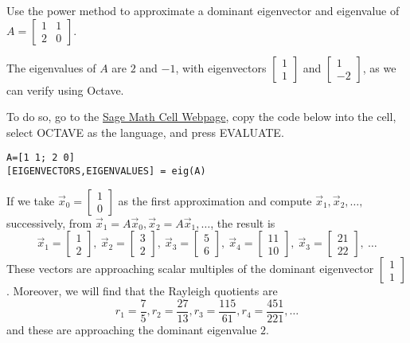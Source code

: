 \documentclass{ximera}
\begin{document}
\begin{exploration}\label{exp:2x2PowerMethod}
Use the power method to approximate a dominant eigenvector and eigenvalue of $A = \left[ \begin{array}{rr}
1 & 1 \\
2 & 0
\end{array}\right]$.

The eigenvalues of $A$ are $2$ and $-1$, with eigenvectors $\left[ \begin{array}{rr}
  1 \\
  1
  \end{array}\right]$ and $\left[ \begin{array}{rr}
  1 \\
  -2
  \end{array}\right]$, as we can verify using Octave. 
  
To do so, go to the \href{https://sagecell.sagemath.org/}{Sage Math Cell Webpage}, copy the code below into the cell, select OCTAVE as the language, and press EVALUATE.


\begin{verbatim}
A=[1 1; 2 0]
[EIGENVECTORS,EIGENVALUES] = eig(A)
\end{verbatim}

  
If we take $\vec{x}_{0} = \left[ \begin{array}{rr}
  1 \\
  0
  \end{array}\right]$ as the first approximation and compute $\vec{x}_{1}, \vec{x}_{2}, \dots,$ successively, from $\vec{x}_{1} = A\vec{x}_{0}, \vec{x}_{2} = A\vec{x}_{1}, \dots$, the result is
\begin{equation*}
\vec{x}_{1} = \left[ \begin{array}{rr}
1 \\
2
\end{array}\right], \
\vec{x}_{2} = \left[ \begin{array}{rr}
3 \\
2
\end{array}\right], \
\vec{x}_{3} = \left[ \begin{array}{rr}
5 \\
6
\end{array}\right], \
\vec{x}_{4} = \left[ \begin{array}{rr}
11 \\
10
\end{array}\right], \
\vec{x}_{3} = \left[ \begin{array}{rr}
21 \\
22
\end{array}\right], \ \dots
\end{equation*}
These vectors are approaching scalar multiples of the dominant eigenvector $\left[ \begin{array}{rr}
1 \\
1
\end{array}\right]$. Moreover, we will find that the Rayleigh quotients are
\begin{equation*}
r_{1} = \frac{7}{5}, r_{2} = \frac{27}{13}, r_{3} = \frac{115}{61}, r_{4} = \frac{451}{221}, \dots
\end{equation*}
and these are approaching the dominant eigenvalue $2$.


\end{exploration}
\end{document}
